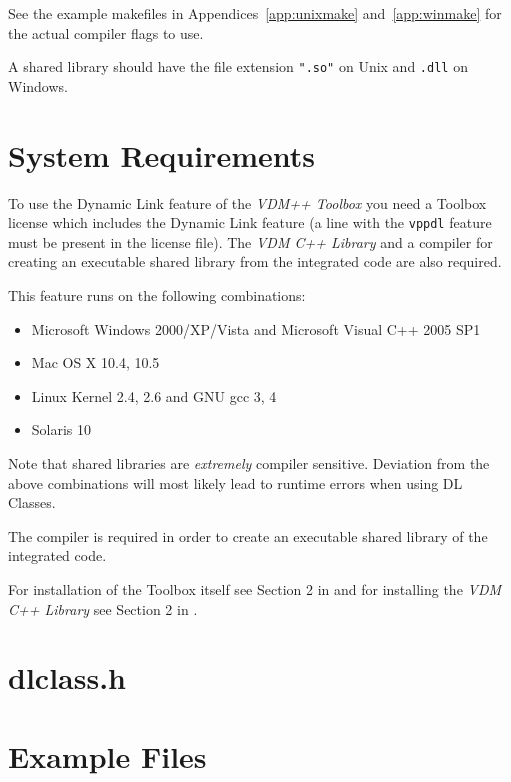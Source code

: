 \documentclass[\pformat,12pt]{article}
\begin{document}
See the example makefiles in Appendices~\ref{app:unixmake}
and~\ref{app:winmake} for the actual compiler flags to use.

A shared library should have the file extension {\tt ".so"} on Unix
and \texttt{.dll} on Windows. 

\newpage


\newpage
\appendix

\section{System Requirements}
\label{sec:sysreq}

To use the Dynamic Link feature of the {\it VDM++ Toolbox} you
need a Toolbox license which includes the Dynamic Link feature
(a line with the {\tt vppdl} feature must be present in the
license file). The {\it VDM  C++ Library} and a compiler for creating
an executable shared library from the integrated code are also required.

This feature runs on the following combinations:
\begin{itemize}
\item Microsoft Windows 2000/XP/Vista and Microsoft Visual C++ 2005 SP1
\item Mac OS X 10.4, 10.5
\item Linux Kernel 2.4, 2.6 and GNU gcc 3, 4
\item Solaris 10
\end{itemize}

Note that shared libraries are \textit{extremely} compiler
sensitive. Deviation from the above combinations will most likely lead
to runtime errors when using DL Classes.

The compiler is required in order to create an executable shared
library of the integrated code. 
 
For installation of the Toolbox itself see Section 2 in \cite{UserManPP-SCSK}
and for installing the {\it VDM C++ Library} see Section 2 in \cite{CGManPP-SCSK}.

\newpage
\section{dlclass.h}\label{app:dlclass_h}



\newpage
\section{Example Files}\label{app:interfacelayer}
\end{document}
